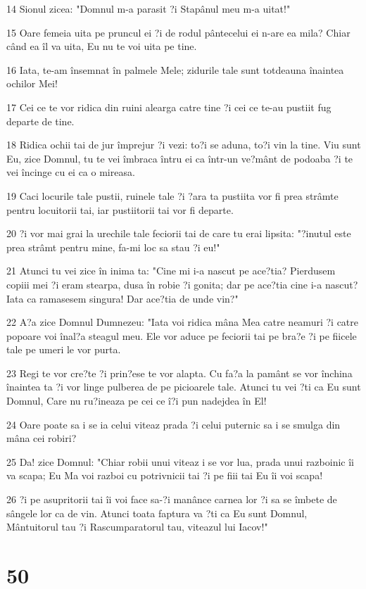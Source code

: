 \par 14 Sionul zicea: "Domnul m-a parasit ?i Stapânul meu m-a uitat!"
\par 15 Oare femeia uita pe pruncul ei ?i de rodul pântecelui ei n-are ea mila? Chiar când ea îl va uita, Eu nu te voi uita pe tine.
\par 16 Iata, te-am însemnat în palmele Mele; zidurile tale sunt totdeauna înaintea ochilor Mei!
\par 17 Cei ce te vor ridica din ruini alearga catre tine ?i cei ce te-au pustiit fug departe de tine.
\par 18 Ridica ochii tai de jur împrejur ?i vezi: to?i se aduna, to?i vin la tine. Viu sunt Eu, zice Domnul, tu te vei îmbraca întru ei ca într-un ve?mânt de podoaba ?i te vei încinge cu ei ca o mireasa.
\par 19 Caci locurile tale pustii, ruinele tale ?i ?ara ta pustiita vor fi prea strâmte pentru locuitorii tai, iar pustiitorii tai vor fi departe.
\par 20 ?i vor mai grai la urechile tale feciorii tai de care tu erai lipsita: "?inutul este prea strâmt pentru mine, fa-mi loc sa stau ?i eu!"
\par 21 Atunci tu vei zice în inima ta: "Cine mi i-a nascut pe ace?tia? Pierdusem copiii mei ?i eram stearpa, dusa în robie ?i gonita; dar pe ace?tia cine i-a nascut? Iata ca ramasesem singura! Dar ace?tia de unde vin?"
\par 22 A?a zice Domnul Dumnezeu: "Iata voi ridica mâna Mea catre neamuri ?i catre popoare voi înal?a steagul meu. Ele vor aduce pe feciorii tai pe bra?e ?i pe fiicele tale pe umeri le vor purta.
\par 23 Regi te vor cre?te ?i prin?ese te vor alapta. Cu fa?a la pamânt se vor închina înaintea ta ?i vor linge pulberea de pe picioarele tale. Atunci tu vei ?ti ca Eu sunt Domnul, Care nu ru?ineaza pe cei ce î?i pun nadejdea în El!
\par 24 Oare poate sa i se ia celui viteaz prada ?i celui puternic sa i se smulga din mâna cei robiri?
\par 25 Da! zice Domnul: "Chiar robii unui viteaz i se vor lua, prada unui razboinic îi va scapa; Eu Ma voi razboi cu potrivnicii tai ?i pe fiii tai Eu îi voi scapa!
\par 26 ?i pe asupritorii tai îi voi face sa-?i manânce carnea lor ?i sa se îmbete de sângele lor ca de vin. Atunci toata faptura va ?ti ca Eu sunt Domnul, Mântuitorul tau ?i Rascumparatorul tau, viteazul lui Iacov!"

\chapter{50}

